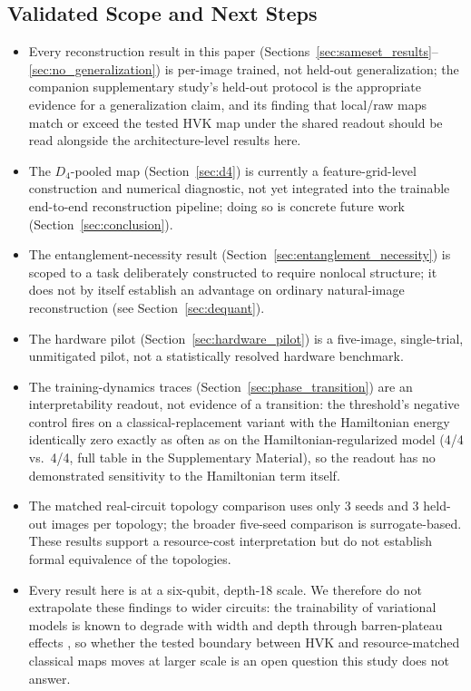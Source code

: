 \documentclass[journal]{IEEEtran}
\begin{document}
\subsection{Validated Scope and Next Steps}
\label{sec:limitations}
\begin{itemize}
    \item Every reconstruction result in this paper (Sections~\ref{sec:sameset_results}--\ref{sec:no_generalization}) is per-image trained, not held-out generalization; the companion supplementary study's held-out protocol is the appropriate evidence for a generalization claim, and its finding that local/raw maps match or exceed the tested HVK map under the shared readout should be read alongside the architecture-level results here.
    \item The $D_4$-pooled map (Section~\ref{sec:d4}) is currently a feature-grid-level construction and numerical diagnostic, not yet integrated into the trainable end-to-end reconstruction pipeline; doing so is concrete future work (Section~\ref{sec:conclusion}).
    \item The entanglement-necessity result (Section~\ref{sec:entanglement_necessity}) is scoped to a task deliberately constructed to require nonlocal structure; it does not by itself establish an advantage on ordinary natural-image reconstruction (see Section~\ref{sec:dequant}).
    \item The hardware pilot (Section~\ref{sec:hardware_pilot}) is a five-image, single-trial, unmitigated pilot, not a statistically resolved hardware benchmark.
    \item The training-dynamics traces (Section~\ref{sec:phase_transition}) are an interpretability readout, not evidence of a transition: the threshold's negative control fires on a classical-replacement variant with the Hamiltonian energy identically zero exactly as often as on the Hamiltonian-regularized model (4/4 vs.\ 4/4, full table in the Supplementary Material), so the readout has no demonstrated sensitivity to the Hamiltonian term itself.
    \item The matched real-circuit topology comparison uses only 3 seeds and 3 held-out images per topology; the broader five-seed comparison is surrogate-based. These results support a resource-cost interpretation but do not establish formal equivalence of the topologies.
    \item Every result here is at a six-qubit, depth-18 scale. We therefore do not extrapolate these findings to wider circuits: the trainability of variational models is known to degrade with width and depth through barren-plateau effects \cite{McClean2018, Larocca2025}, so whether the tested boundary between HVK and resource-matched classical maps moves at larger scale is an open question this study does not answer.
\end{itemize}
\end{document}
